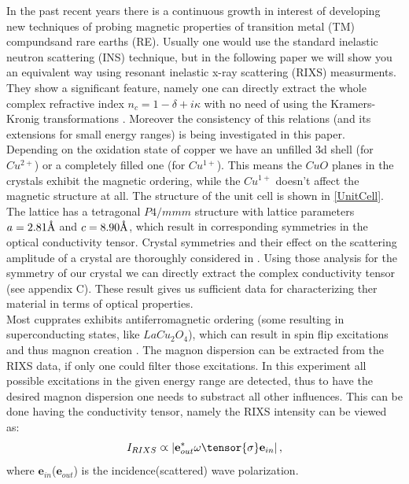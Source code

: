 \documentclass[twocolumn,amsmath,superscriptaddress,amssymb]{revtex4-1}
\newcommand{\vect}[1]{\boldsymbol{#1}}
\newcommand{\angstrom}{\textup{\AA}}
\let\vec\mathbf
\begin{document}
In the past recent years there is a continuous growth in interest of developing new techniques of probing magnetic properties of transition metal (TM) compundsand rare earths (RE). Usually one would use the standard inelastic neutron scattering (INS) technique, but in the following paper we will show you an equivalent way using resonant inelastic x-ray scattering (RIXS) measurments. They show a significant feature, namely one can directly extract the whole complex refractive index $n_c = 1-\delta + i\kappa$ with no need of using the Kramers-Kronig transformations \cite{Llosa,Emeis}. Moreover the consistency of this relations (and its extensions for small energy ranges) is being investigated in this paper. \\
\indent Depending on the oxidation state of copper we have an unfilled 3d shell (for $Cu^{2+}$) or a completely filled one (for $Cu^{1+}$). This means the $CuO$ planes in the crystals exhibit the magnetic ordering, while the $Cu^{1+}$ doesn't affect the magnetic structure at all. The structure of the unit cell is shown in \ref{UnitCell}. The lattice has a tetragonal $P4/mmm$ structure with lattice parameters $a=2.81\angstrom$ and $c=8.90\angstrom$, which result in corresponding symmetries in the optical conductivity tensor. Crystal symmetries and their effect on the scattering amplitude of a crystal are thoroughly considered in \cite{Haverkort2}. Using those analysis for the symmetry of our crystal we can directly extract the complex conductivity tensor (see appendix C). These result gives us sufficient data for characterizing ther material in terms of optical properties.\\
\indent Most cupprates exhibits antiferromagnetic ordering (some resulting in superconducting states, like $LaCu_2O_4$), which can result in spin flip excitations and thus magnon creation \cite{Haverkort}. The magnon dispersion can be extracted from the RIXS data, if only one could filter those excitations. In this experiment all possible excitations in the given energy range are detected, thus to have the desired magnon dispersion one needs to substract all other influences. This can be done having the conductivity tensor, namely the RIXS intensity can be viewed as:
\begin{equation}
I_{RIXS}\varpropto\left|\vec{e}_{out}^*\omega\tensor{\sigma}\vec{e}_{in}\right|, 
\end{equation}
\noindent where $\vect{e}_{in}$($\vect{e}_{out}$)  is the incidence(scattered) wave polarization.
\end{document}
